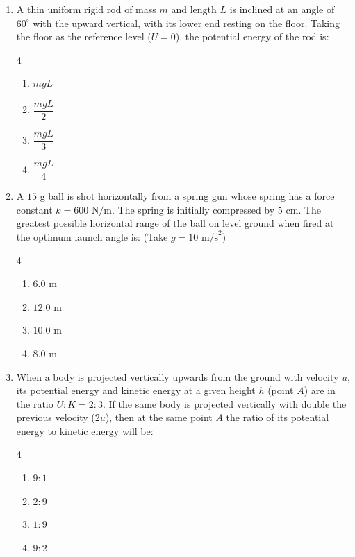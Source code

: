 \documentclass[11pt,a4paper]{article}
\begin{document}
\begin{enumerate}[label=\textbf{\arabic*.},leftmargin=18pt,itemsep=8pt,resume]
  \item A thin uniform rigid rod of mass $m$ and length $L$ is inclined at an angle of $60^\circ$ with the upward vertical, with its lower end resting on the floor. Taking the floor as the reference level ($U=0$), the potential energy of the rod is:
  \begin{multicols}{4}
    \begin{enumerate}[label=(\Alph*)]
      \item $mgL$
      \item $\dfrac{mgL}{2}$
      \item $\dfrac{mgL}{3}$
      \item $\dfrac{mgL}{4}$
    \end{enumerate}
  \end{multicols}

  \item A $15\text{ g}$ ball is shot horizontally from a spring gun whose spring has a force constant $k = 600\text{ N/m}$. The spring is initially compressed by $5\text{ cm}$. The greatest possible horizontal range of the ball on level ground when fired at the optimum launch angle is: (Take $g = 10\text{ m/s}^2$)
  \begin{multicols}{4}
    \begin{enumerate}[label=(\Alph*)]
      \item $6.0\text{ m}$
      \item $12.0\text{ m}$
      \item $10.0\text{ m}$
      \item $8.0\text{ m}$
    \end{enumerate}
  \end{multicols}

  \item When a body is projected vertically upwards from the ground with velocity $u$, its potential energy and kinetic energy at a given height $h$ (point $A$) are in the ratio $U : K = 2 : 3$. If the same body is projected vertically with double the previous velocity ($2u$), then at the same point $A$ the ratio of its potential energy to kinetic energy will be:
  \begin{multicols}{4}
    \begin{enumerate}[label=(\Alph*)]
      \item $9 : 1$
      \item $2 : 9$
      \item $1 : 9$
      \item $9 : 2$
    \end{enumerate}
  \end{multicols}


\end{enumerate}
\end{document}
